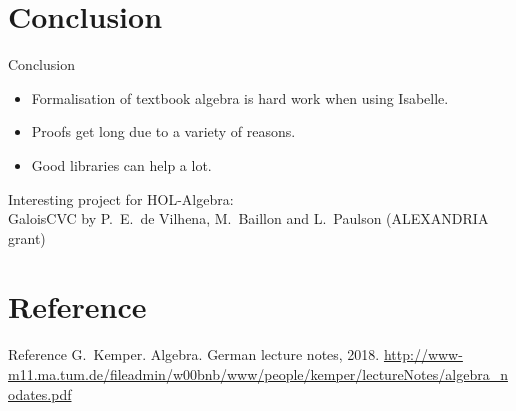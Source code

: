 \documentclass[%
	sans,
	12pt,
]{beamer}
\begin{document}
\section{Conclusion}
\begin{frame}{Conclusion}
\begin{itemize}
\item Formalisation of textbook algebra is hard work when using Isabelle.\pause%
\item Proofs get long due to a variety of reasons.\pause
\item Good libraries can help a lot.\pause\\[6mm] %
\end{itemize}
Interesting project for HOL-Algebra:\\[2mm]
GaloisCVC by P.\ E.\ de Vilhena, M.\ Baillon and L.\ Paulson (ALEXANDRIA grant)
\end{frame}

\section{Reference}
\begin{frame}{Reference}
	G.\ Kemper. Algebra. German lecture notes, 2018. \url{http://www-m11.ma.tum.de/fileadmin/w00bnb/www/people/kemper/lectureNotes/algebra\_nodates.pdf} 
\end{frame}
\end{document}
